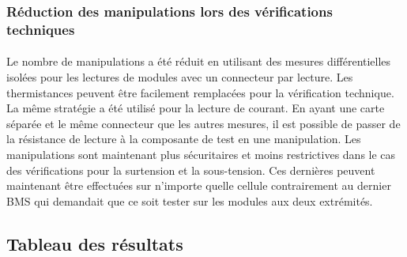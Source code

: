 		\subsubsection{Réduction des manipulations lors des vérifications techniques}
	
			\paragraph{}
			Le nombre de manipulations a été réduit en utilisant des mesures différentielles isolées pour les lectures de modules avec un connecteur par lecture. Les thermistances peuvent être facilement remplacées pour la vérification technique. La même stratégie a été utilisé pour la lecture de courant. En ayant une carte séparée et le même connecteur que les autres mesures, il est possible de passer de la résistance de lecture à la composante de test en une manipulation. Les manipulations sont maintenant plus sécuritaires et moins restrictives dans le cas des vérifications pour la surtension et la sous-tension. Ces dernières peuvent maintenant être effectuées sur n'importe quelle cellule contrairement au dernier BMS qui demandait que ce soit tester sur les modules aux deux extrémités.


	\subsection{Tableau des résultats}

		\paragraph{}
		
